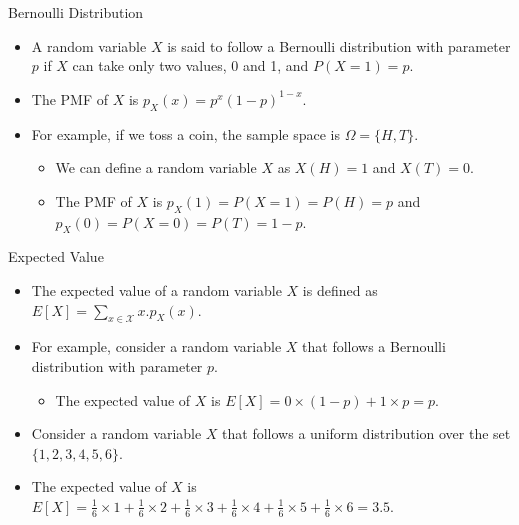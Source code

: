 \documentclass[handout]{beamer}
\begin{document}
\begin{frame}{Bernoulli Distribution}
    \begin{itemize}
        \item A random variable $X$ is said to follow a Bernoulli distribution with parameter $p$ if $X$ can take only two values, 0 and 1, and $P(X = 1) = p$.
        \item The PMF of $X$ is $p_X(x) = p^x(1 - p)^{1 - x}$.
        \item For example, if we toss a coin, the sample space is  $\Omega = \{H, T\}$. 
        \begin{itemize}
            \item We can define a random variable $X$ as $X(H) = 1$ and $X(T) = 0$.
            \item The PMF of $X$ is $p_X(1) = P(X = 1) = P(H) = p$ and $p_X(0) = P(X = 0) = P(T) = 1 - p$.
        \end{itemize}
    \end{itemize}

    \begin{figure}
        
 
        
        
         \end{figure}
      
    
\end{frame}

\begin{frame}{Expected Value}
    \begin{itemize}
        \item The expected value of a random variable $X$ is defined as $E[X] = \sum_{x \in \mathcal{X}} x.p_X(x)$.
        \item For example, consider a random variable $X$ that follows a Bernoulli distribution with parameter $p$. 
        \begin{itemize}
            \item The expected value of $X$ is $E[X] = 0 \times (1 - p) + 1 \times p = p$.
        \end{itemize}
        \item Consider a random variable $X$ that follows a uniform distribution over the set $\{1, 2, 3, 4, 5, 6\}$.
        \item The expected value of $X$ is $E[X] = \frac{1}{6} \times 1 + \frac{1}{6} \times 2 + \frac{1}{6} \times 3 + \frac{1}{6} \times 4 + \frac{1}{6} \times 5 + \frac{1}{6} \times 6 = 3.5$.
    \end{itemize}
    
\end{frame}
\end{document}
